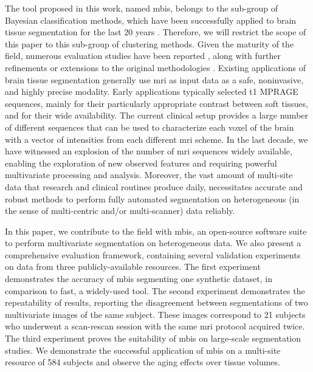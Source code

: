 The tool proposed in this work, named \gls*{mbis}, belongs to the sub-group of
  Bayesian classification methods, which have been successfully
  applied to brain tissue segmentation for the last 20 years
  \citep{van_leemput_automated_1999-1}.
Therefore, we will restrict the scope of this paper to this
  sub-group of clustering methods.
Given the maturity of the field, numerous evaluation studies have been reported
  \citep{cuadra_comparison_2005,de_boer_accuracy_2010,roche_convergence_2011},
  along with further refinements or extensions to the original methodologies
  \citep{zhang_segmentation_2001,van_leemput_unifying_2003,
  ashburner_unified_2005,fischl_whole_2002}.
Existing applications of brain tissue segmentation generally
  use \gls*{mri} as input data as a safe, noninvasive,
  and highly precise modality.
Early applications typically selected \acrfull*{t1}
  MPRAGE sequences, mainly for their particularly appropriate
  contrast between soft tissues, and for their wide availability.
The current clinical setup provides a large number
  of different sequences that can be used to
  characterize each voxel of the brain with a vector of
  intensities from each different \gls*{mri} scheme.
In the last decade, we have witnessed an
  explosion of the number of \gls*{mri} sequences widely available, enabling
  the exploration of new observed features and requiring powerful multivariate
  processing and analysis.
Moreover, the vast amount of multi-site data
  that research and clinical routines produce daily,
  necessitates accurate and robust methods to
  perform fully automated segmentation on heterogeneous 
  (in the sense of multi-centric and/or multi-scanner) data
  reliably.

In this paper, we contribute to the field with \gls*{mbis}, an open-source 
  software suite to perform multivariate segmentation on 
  heterogeneous data.
We also present a comprehensive evaluation framework,
  containing several validation experiments on data
  from three publicly-available resources.
The first experiment demonstrates the accuracy of \gls*{mbis} segmenting
  one synthetic dataset, in comparison to \gls*{fast}, a widely-used tool.
The second experiment demonstrates the repeatability of results,
  reporting the disagreement between segmentations of two
  multivariate images of the same subject.
These images correspond to 21 subjects who underwent a scan-rescan
  session with the same \gls*{mri} protocol acquired twice.
The third experiment proves the suitability of \gls*{mbis} on large-scale
  segmentation studies.
We demonstrate the successful application of \gls*{mbis} on a multi-site
  resource of 584 subjects and observe the aging effects over
  tissue volumes.

